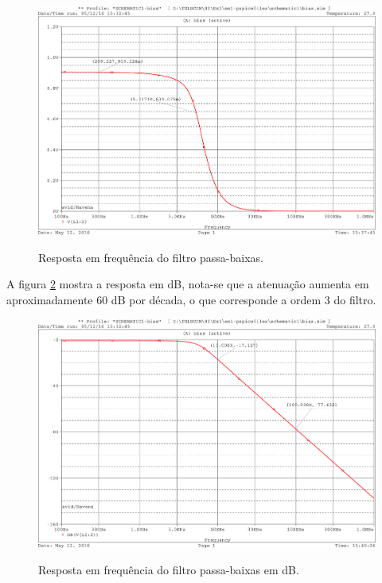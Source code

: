 \begin{figure}[!h]
  \centering
  
  \includegraphics[scale=0.3]{Imagens/resp_freq}
  \label{fig:resp_freq}
  \caption{Resposta em frequência do filtro passa-baixas.}
\end{figure}

A figura \ref{fig:resp_freq_db} mostra a resposta em dB, nota-se que a 
atenuação aumenta em aproximadamente 60 dB por década, o que corresponde a 
ordem 3 do filtro.

\begin{figure}[!h]
  \centering
  
  \includegraphics[scale=0.3]{Imagens/resp_freq_db}
  \label{fig:resp_freq_db}
  \caption{Resposta em frequência do filtro passa-baixas em dB.}
\end{figure}

